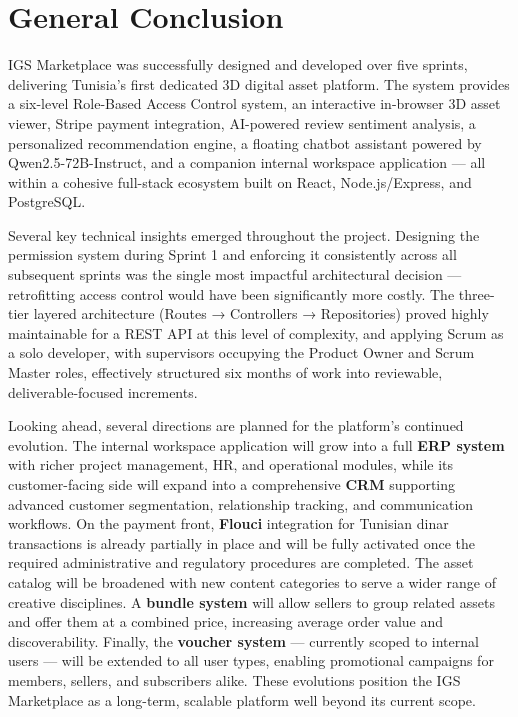 \chapter*{General Conclusion}

IGS Marketplace was successfully designed and developed over five sprints, delivering Tunisia's first dedicated 3D digital asset platform. The system provides a six-level Role-Based Access Control system, an interactive in-browser 3D asset viewer, Stripe payment integration, AI-powered review sentiment analysis, a personalized recommendation engine, a floating chatbot assistant powered by Qwen2.5-72B-Instruct, and a companion internal workspace application — all within a cohesive full-stack ecosystem built on React, Node.js/Express, and PostgreSQL.

Several key technical insights emerged throughout the project. Designing the permission system during Sprint 1 and enforcing it consistently across all subsequent sprints was the single most impactful architectural decision — retrofitting access control would have been significantly more costly. The three-tier layered architecture (Routes → Controllers → Repositories) proved highly maintainable for a REST API at this level of complexity, and applying Scrum as a solo developer, with supervisors occupying the Product Owner and Scrum Master roles, effectively structured six months of work into reviewable, deliverable-focused increments.

Looking ahead, several directions are planned for the platform's continued evolution. The internal workspace application will grow into a full \textbf{ERP system} with richer project management, HR, and operational modules, while its customer-facing side will expand into a comprehensive \textbf{CRM} supporting advanced customer segmentation, relationship tracking, and communication workflows. On the payment front, \textbf{Flouci} integration for Tunisian dinar transactions is already partially in place and will be fully activated once the required administrative and regulatory procedures are completed. The asset catalog will be broadened with new content categories to serve a wider range of creative disciplines. A \textbf{bundle system} will allow sellers to group related assets and offer them at a combined price, increasing average order value and discoverability. Finally, the \textbf{voucher system} — currently scoped to internal users — will be extended to all user types, enabling promotional campaigns for members, sellers, and subscribers alike. These evolutions position the IGS Marketplace as a long-term, scalable platform well beyond its current scope.
